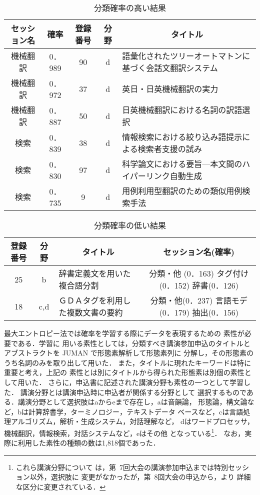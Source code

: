 \begin{table*}
\caption[表]{\label{meout} 分類確率の高い結果}
\begin{center}
\scriptsize
\begin{tabular}{|c|c|c|c|l|}\hline
セッション名& 確率 & 登録番号 & 分野 & \multicolumn{1}{|c|}{タイトル}\\\hline
機械翻訳 & 0．989 & 90 & d & 語彙化されたツリーオートマトンに基づく会話文翻訳システム \\\hline
機械翻訳 & 0．972 & 37 & d & 英日・日英機械翻訳の実力 \\\hline 
機械翻訳 & 0．887 & 50 & d & 日英機械翻訳における名詞の訳語選択\\\hline
検索 & 0．839 & 38 & d & 情報検索における絞り込み語提示による検索者支援の試み\\\hline
検索 & 0．830 & 97 & d & 科学論文における要旨—本文間のハイパーリンク自動生成 \\\hline
検索 & 0．735 & 9 & d & 用例利用型翻訳のための類似用例検索手法 \\\hline
\end{tabular}
\end{center}
\end{table*}

\begin{table*}
\caption[表]{\label{memondai} 分類確率の低い結果}
\vspace*{-3mm}
\begin{center}
\scriptsize
\begin{tabular}{|c|c|l|c|}\hline
 登録番号 & 分野 & \multicolumn{1}{|c|}{タイトル} & セッション名(確率) \\\hline
25 & b & 辞書定義文を用いた複合語分割 & 分類・他 (0．163) タグ付け(0．152) 辞書(0．126) \\\hline
18 & c,d & ＧＤＡタグを利用した複数文書の要約 & 分類・他(0．237) 言語モデ(0．179) 抽出(0．156) \\\hline
\end{tabular}
\end{center}
\end{table*}

最大エントロピー法では確率を学習する際にデータを表現するための
素性が必要である．学習に
用いる素性としては，分類すべき講演参加申込のタイトルとアブストラクトを
JUMAN\cite{KurohashiAndNagao} で形態素解析して形態素列に
分解し，その形態素のうち名詞のみを取り出して用いた．
また，タイトルに現れたキーワードは特に重要と考え，上記の
素性とは別にタイトルから得られた形態素は別個の素性として用いた．
さらに，申込書に記述された講演分野も素性の一つとして学習した．
講演分野とは講演申込時に申込者が関係する分野として
選択するものである．講演分野として選択肢はaからeまで存在し，aは音韻論，
形態論，構文論など，bは計算辞書学，ターミノロジー，テキストデータ
ベースなど，cは言語処理アルゴリズム，解析・生成システム，対話理解など，
dはワードプロセッサ，機械翻訳，情報検索，対話システムなど，eはその他
となっている\footnote{これら講演分野について
は，第\ 7回大会の講演参加申込までは特別セッション以外，選択肢に
変更がなかったが，第\ 8回大会の申込から，より
詳細な区分に変更されている．}．
なお，実際に利用した素性の種類の数は1,818個であった．

